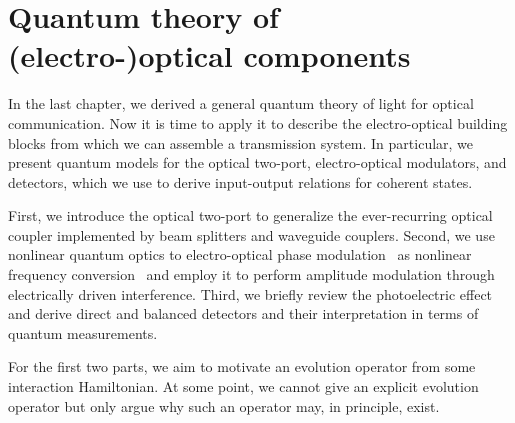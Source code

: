 \chapter{Quantum theory of (electro-)optical components}

In the last chapter, we derived a general quantum theory of light for optical communication.
Now it is time to apply it to describe the electro-optical building blocks from which we can assemble a transmission system.
In particular, we present quantum models for the optical two-port, electro-optical modulators, and detectors, which we use to derive input-output relations for coherent states.

First, we introduce the optical two-port to generalize the ever-recurring optical coupler implemented by beam splitters and waveguide couplers.
Second, we use nonlinear quantum optics to electro-optical phase modulation~\cite{Horoshko2018} as nonlinear frequency conversion~\cite{QuesadaMejia2015} and employ it to perform amplitude modulation through electrically driven interference.
Third, we briefly review the photoelectric effect~\cite{Mandel1995,Vogel2006} and derive direct and balanced detectors and their interpretation in terms of quantum measurements.

For the first two parts, we aim to motivate an evolution operator from some interaction Hamiltonian. 
At some point, we cannot give an explicit evolution operator but only argue why such an operator may, in principle, exist.